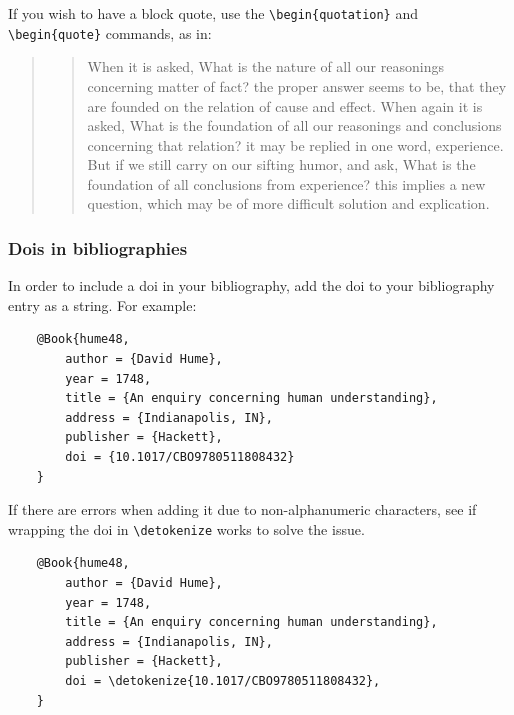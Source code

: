 If you wish to have a block quote, use the \verb|\begin{quotation}| and \verb|\begin{quote}| commands, as in:

\begin{quotation}
    \begin{quote}
        When it is asked, What is the nature of all our reasonings concerning matter of fact? the proper answer seems to be, that they are founded on the relation of cause and effect. When again it is asked, What is the foundation of all our reasonings and conclusions concerning that relation? it may be replied in one word, experience. But if we still carry on our sifting humor, and ask, What is the foundation of all conclusions from experience? this implies a new question, which may be of more difficult solution and explication. \cite{hume48}
    \end{quote}
\end{quotation}

\subsubsection{Dois in bibliographies \label{dois-in-bibliographies}}

In order to include a doi in your bibliography, add the doi to your bibliography
entry as a string. For example:
\vspace{1mm}
\begin{verbatim}
    @Book{hume48,
        author = {David Hume},
        year = 1748,
        title = {An enquiry concerning human understanding},
        address = {Indianapolis, IN},
        publisher = {Hackett},
        doi = {10.1017/CBO9780511808432}
    }
\end{verbatim}
\vspace{1mm}

If there are errors when adding it due to non-alphanumeric characters, see if
wrapping the doi in \texttt{\textbackslash{}detokenize} works to solve the issue.

\vspace{1mm}
\begin{verbatim}
    @Book{hume48,
        author = {David Hume},
        year = 1748,
        title = {An enquiry concerning human understanding},
        address = {Indianapolis, IN},
        publisher = {Hackett},
        doi = \detokenize{10.1017/CBO9780511808432},
    }
\end{verbatim}
\vspace{1mm}

